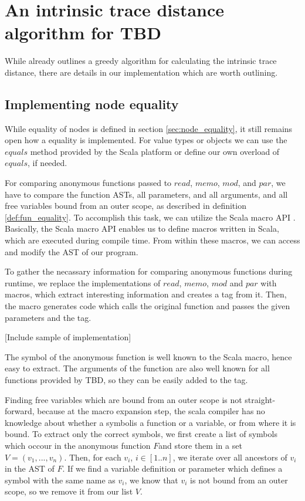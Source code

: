 \section{An intrinsic trace distance algorithm for TBD}
While \cite{Acar2005thesis} already outlines a greedy algorithm for calculating the intrinsic trace distance, there are details in our implementation which are worth outlining. 

\subsection{Implementing node equality}
While equality of nodes is defined in section \ref{sec:node_equality}, it still remains open how a equality is implemented. For value types or objects we can use the $equals$ method provided by the Scala platform or define our own overload of $equals$, if needed.  

For comparing anonymous functions passed to $read$, $memo$, $mod$, and $par$, we have to compare the function ASTs, all parameters, and all arguments, and all free variables bound from an outer scope, as described in definition \ref{def:fun_equality}. To accomplish this task, we can utilize the Scala macro API \cite{burmako2013scala}. Basically, the Scala macro API enables us to define macros written in Scala, which are executed during compile time. From within these macros, we can access and modify the AST of our program. 

To gather the necassary information for comparing anonymous functions during runtime, we replace the implementations of $read$, $memo$, $mod$ and $par$ with macros, which extract interesting information and creates a tag from it. Then, the macro generates code which calls the original function and passes the given parameters and the tag. 

[Include sample of implementation]

The symbol of the anonymous function is well known to the Scala macro, hence easy to extract. The arguments of the function are also well known for all functions provided by TBD, so they can be easily added to the tag. 

Finding free variables which are bound from an outer scope is not straight-forward, because at the macro expansion step, the scala compiler has no knowledge about whether a symbolis a function or a variable, or from where it is bound. To extract only the correct symbols, we first create a list of symbols which occour in the anonymous function $F$and store them in a set $V = (v_1, ..., v_n)$. Then, for each $v_i$, $i \in[1..n]$, we iterate over all ancestors of $v_i$ in the AST of $F$. If we find a variable definition or parameter which defines a symbol with the same name as $v_i$, we know that $v_i$ is not bound from an outer scope, so we remove it from our list $V$.

